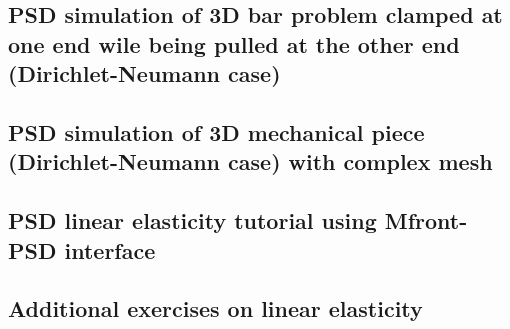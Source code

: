 \pagebreak



\subsection{PSD simulation of 3D bar problem clamped at one end wile being pulled at the other end (Dirichlet-Neumann case)\label{sec:3d-bar-clamped3}}

{
	\renewcommand{\subsection}{\subsubsection}
	
}

\pagebreak


\subsection{PSD simulation of 3D  mechanical piece (Dirichlet-Neumann case) with complex mesh\label{sec:3d-bar-clamped3-sub}}

{
	\renewcommand{\subsection}{\subsubsection}
	
}
\pagebreak
\subsection{PSD linear elasticity tutorial using Mfront-PSD interface\label{sec:2d-mfront}}

{
\renewcommand{\subsection}{\subsubsection}

}


\subsection{Additional exercises on linear elasticity}
{
	\renewcommand{\subsection}{\subsubsection}
	
}


